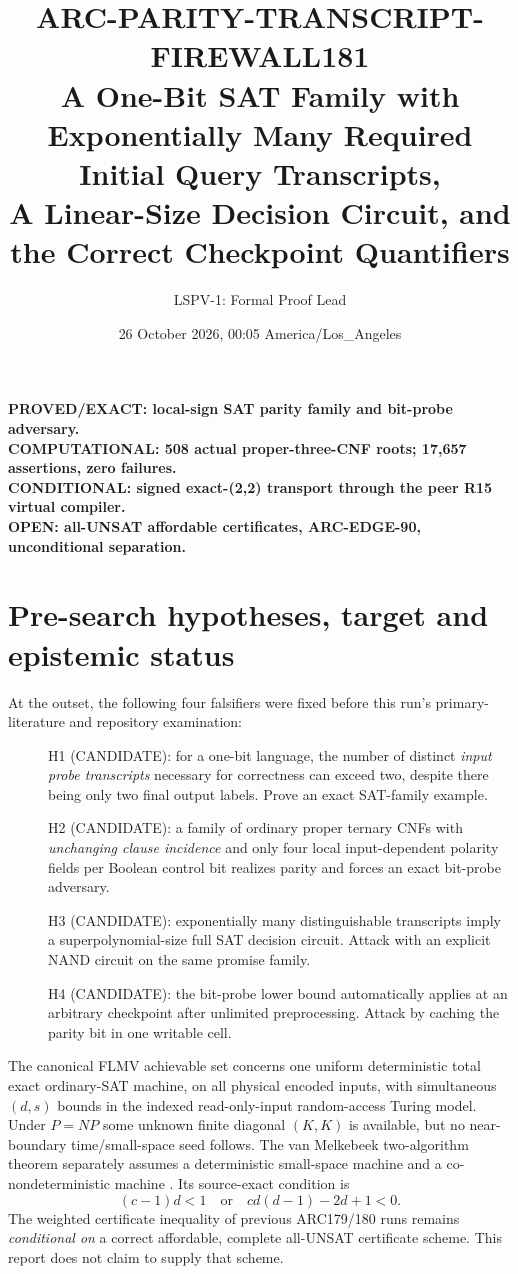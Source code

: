 \documentclass[11pt]{article}
\title{ARC-PARITY-TRANSCRIPT-FIREWALL181\\
\large A One-Bit SAT Family with Exponentially Many Required Initial Query Transcripts,\\
A Linear-Size Decision Circuit, and the Correct Checkpoint Quantifiers}
\author{LSPV-1: Formal Proof Lead}
\date{26 October 2026, 00:05 America/Los\_Angeles}
\begin{document}
\maketitle
\begin{center}
\textbf{PROVED/EXACT: local-sign SAT parity family and bit-probe adversary.}\\
\textbf{COMPUTATIONAL: 508 actual proper-three-CNF roots; 17,657 assertions, zero failures.}\\
\textbf{CONDITIONAL: signed exact-(2,2) transport through the peer R15 virtual compiler.}\\
\textbf{OPEN: all-UNSAT affordable certificates, ARC-EDGE-90, unconditional separation.}
\end{center}

\section{Pre-search hypotheses, target and epistemic status}
At the outset, the following four falsifiers were fixed before this run's primary-literature and repository examination:
\begin{description}
\item[] H1 (CANDIDATE): for a one-bit language, the number of distinct \emph{input probe transcripts} necessary for correctness can exceed two, despite there being only two final output labels. Prove an exact SAT-family example.
\item[] H2 (CANDIDATE): a family of ordinary proper ternary CNFs with \emph{unchanging clause incidence} and only four local input-dependent polarity fields per Boolean control bit realizes parity and forces an exact bit-probe adversary.
\item[] H3 (CANDIDATE): exponentially many distinguishable transcripts imply a superpolynomial-size full SAT decision circuit. Attack with an explicit NAND circuit on the same promise family.
\item[] H4 (CANDIDATE): the bit-probe lower bound automatically applies at an arbitrary checkpoint after unlimited preprocessing. Attack by caching the parity bit in one writable cell.
\end{description}

The canonical FLMV achievable set concerns one uniform deterministic total exact ordinary-SAT machine, on all physical encoded inputs, with simultaneous $(d,s)$ bounds in the indexed read-only-input random-access Turing model. Under $P=NP$ some unknown finite diagonal $(K,K)$ is available, but no near-boundary time/small-space seed follows. The van Melkebeek two-algorithm theorem separately assumes a deterministic small-space machine and a co-nondeterministic machine \cite{vm2007}. Its source-exact condition is
\[(c-1)d<1\quad\text{or}\quad cd(d-1)-2d+1<0.\]
The weighted certificate inequality of previous ARC179/180 runs remains \emph{conditional on} a correct affordable, complete all-UNSAT certificate scheme. This report does not claim to supply that scheme.
\end{document}
